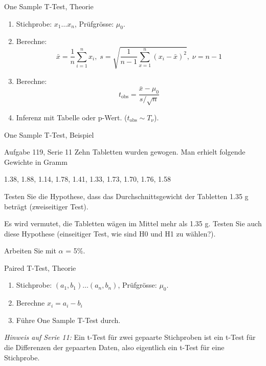 \documentclass{beamer}
\begin{document}
\begin{frame}{One Sample T-Test, Theorie}
\begin{enumerate}
\item Stichprobe: $x_1\ldots x_n$, Prüfgrösse: $\mu_0$.
\item Berechne:
$$
\bar{x}=\frac{1}{n}\sum_{i=1}^n x_i,\;
s=\sqrt{\frac{1}{n-1}\sum_{x=1}^{n}(x_i-\bar{x})^2},\;
\nu=n-1
$$
\item Berechne:
$$
t_\text{obs}=\frac{\bar{x}-\mu_0}{s/\sqrt{n}}
$$
\item Inferenz mit Tabelle oder p-Wert. ($t_\text{obs}\sim T_\nu$).
\end{enumerate}
\end{frame}

\begin{frame}{One Sample T-Test, Beispiel}
\begin{beamerboxesrounded}[shadow]{Aufgabe 119, Serie 11}
Zehn Tabletten wurden gewogen. Man erhielt folgende Gewichte in Gramm
\begin{center}1.38, 1.88, 1.14, 1.78, 1.41, 1.33, 1.73, 1.70, 1.76, 1.58\end{center}
\begin{outline}
\item Testen Sie die Hypothese, dass das Durchschnittsgewicht der Tabletten 1.35 g 
beträgt (zweiseitiger Test).
\item Es wird vermutet, die Tabletten wägen im Mittel mehr als 1.35 g. Testen Sie auch diese
Hypothese (einseitiger Test, wie sind H0 und H1 zu wählen?).
\end{outline}
Arbeiten Sie mit $\alpha$ = 5\%.
\end{beamerboxesrounded}
\end{frame}

\begin{frame}{Paired T-Test, Theorie}
\begin{enumerate}
\item Stichprobe: $(a_1, b_1)\ldots (a_n,b_n)$, Prüfgrösse: $\mu_0$.
\item Berechne $x_i=a_i-b_i$
\item Führe One Sample  T-Test durch.
\end{enumerate}
\vfill
\textit{Hinweis auf Serie 11:} Ein t-Test für zwei gepaarte Stichproben ist ein
t-Test für die Differenzen der gepaarten Daten, also eigentlich ein t-Test für
eine Stichprobe.
\end{frame}
\end{document}
